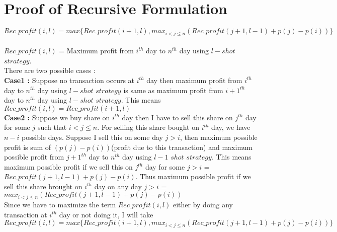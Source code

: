 \documentclass{article}
\begin{document}
\section{Proof of Recursive Formulation}
$$Rec\_profit(i,l)=max\{Rec\_profit(i+1,l),max_{i<j\leq n}(Rec\_profit(j+1,l-1)+p(j)-p(i))\}$$\\
$Rec\_profit(i,l)$ = Maximum profit from $i^{th}$ day to $n^{th}$ day using $l-shot$ $strategy$.\\ There are two possible cases : \\
\textbf{Case1 :} Suppose no transaction occurs at $i^{th}$ day then maximum profit from $i^{th}$ day to $n^{th}$ day using $l-shot$ $strategy$ is same as maximum profit from $i+1^{th}$ day to $n^{th}$ day using $l-shot$ $strategy$. This means $Rec\_profit(i,l)=Rec\_profit(i+1,l)$\\
\textbf{Case2 :} Suppose we buy share on $i^{th}$ day then I have to sell this share on $j^{th}$ day for some $j$ such that $i<j\leq n$. For selling this share bought on $i^{th}$ day, we have $n-i$ possible days. Suppose I sell this on some day $j>i$, then maximum possible profit is sum of $(p(j)-p(i))$(profit due to this transaction) and maximum possible profit from $j+1^{th}$ day to $n^{th}$ day using $l-1$ $shot$ $strategy$. This means maximum possible profit if we sell this on $j^{th}$ day for some $j>i$ = $Rec\_profit(j+1,l-1)+p(j)-p(i)$. Thus maximum possible profit if we sell this share brought on $i^{th}$ day on any day $j>i$ = $max_{i<j\leq n}(Rec\_profit(j+1,l-1)+p(j)-p(i))$\\
Since we have to maximize the term $Rec\_profit(i,l)$ either by doing any transaction at $i^{th}$ day or not doing it, I will take $$Rec\_profit(i,l)=max\{Rec\_profit(i+1,l),max_{i<j\leq n}(Rec\_profit(j+1,l-1)+p(j)-p(i))\}$$
\end{document}
